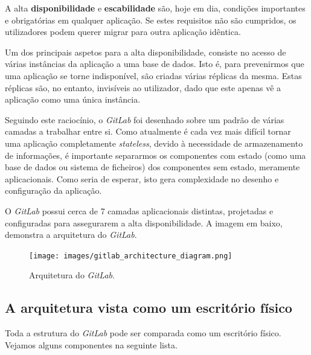 \documentclass[12pt,a4paper]{article}
\begin{document}
A alta \textbf{disponibilidade} e \textbf{escabilidade} são, hoje em dia, condições importantes e obrigatórias em qualquer aplicação. Se estes requisitos não são cumpridos, os utilizadores podem querer migrar para outra aplicação idêntica.

Um dos principais aspetos para a alta disponibilidade, consiste no acesso de várias instâncias da aplicação a uma base de dados. Isto é, para prevenirmos que uma aplicação se torne indisponível, são criadas várias réplicas da mesma. Estas réplicas são, no entanto, invisíveis ao utilizador, dado que este apenas vê a aplicação como uma única instância.

Seguindo este raciocínio, o \emph{GitLab} foi desenhado sobre um padrão de várias camadas a trabalhar entre si. Como atualmente é cada vez mais difícil tornar uma aplicação completamente \emph{stateless}, devido à necessidade de armazenamento de informações, é importante separarmos os componentes com estado (como uma base de dados ou sistema de ficheiros) dos componentes sem estado, meramente aplicacionais. Como seria de esperar, isto gera complexidade no desenho e configuração da aplicação.

O \emph{GitLab} possui cerca de 7 camadas aplicacionais distintas, projetadas e configuradas para assegurarem a alta disponibilidade. A imagem em baixo, demonstra a arquitetura do \emph{GitLab}.

\begin{figure}[H]
  \centering
  \texttt{[image: images/gitlab\_architecture\_diagram.png]}
  \caption{Arquitetura do \emph{GitLab}.}
\end{figure}

\newpage
\subsection{A arquitetura vista como um escritório físico}

Toda a estrutura do \emph{GitLab} pode ser comparada como um escritório físico. Vejamos alguns componentes na seguinte lista.
\end{document}
